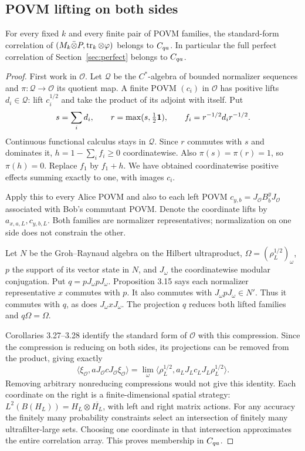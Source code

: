 \subsection{POVM lifting on both sides}
\begin{theorem}\label{thm:C}
For every fixed $k$ and every finite pair of POVM families, the standard-form correlation of $(M_k\bar\otimes P,\operatorname{tr}_k\otimes\varphi)$ belongs to $C_{qa}$. In particular the full perfect correlation of Section~\ref{sec:perfect} belongs to $C_{qa}$.
\end{theorem}
\begin{proof}
First work in $\mathcal O$. Let $\mathcal Q$ be the $C^*$-algebra of bounded normalizer sequences and $\pi:\mathcal Q\to\mathcal O$ its quotient map. A finite POVM $(c_i)$ in $\mathcal O$ has positive lifts $d_i\in\mathcal Q$: lift $c_i^{1/2}$ and take the product of its adjoint with itself. Put
\[
 s=\sum_i d_i,\qquad r=\max(s,\tfrac12\mathbf1),\qquad
 f_i=r^{-1/2}d_ir^{-1/2}.
\]
Continuous functional calculus stays in $\mathcal Q$. Since $r$ commutes with $s$ and dominates it, $h=1-\sum_i f_i\ge0$ coordinatewise. Also $\pi(s)=\pi(r)=1$, so $\pi(h)=0$. Replace $f_1$ by $f_1+h$. We have obtained coordinatewise positive effects summing exactly to one, with images $c_i$.

Apply this to every Alice POVM and also to each left POVM $c_{y,b}=J_{\mathcal O}B_b^yJ_{\mathcal O}$ associated with Bob's commutant POVM. Denote the coordinate lifts by $a_{x,a,L},c_{y,b,L}$. Both families are normalizer representatives; normalization on one side does not constrain the other.

Let $N$ be the Groh--Raynaud algebra on the Hilbert ultraproduct, $\Omega=(\rho_L^{1/2})_\omega$, $p$ the support of its vector state in $N$, and $J_\omega$ the coordinatewise modular conjugation. Put $q=pJ_\omega pJ_\omega$. Proposition 3.15 says each normalizer representative $x$ commutes with $p$. It also commutes with $J_\omega pJ_\omega\in N'$. Thus it commutes with $q$, as does $J_\omega xJ_\omega$. The projection $q$ reduces both lifted families and $q\Omega=\Omega$.

Corollaries 3.27--3.28 identify the standard form of $\mathcal O$ with this compression. Since the compression is reducing on both sides, its projections can be removed from the product, giving exactly
\begin{equation}\label{eq:ultralimit}
 \langle\xi_{\mathcal O},aJ_{\mathcal O}cJ_{\mathcal O}\xi_{\mathcal O}\rangle
 =\lim_\omega\langle\rho_L^{1/2},a_LJ_Lc_LJ_L\rho_L^{1/2}\rangle.
\end{equation}
Removing arbitrary nonreducing compressions would not give this identity. Each coordinate on the right is a finite-dimensional spatial strategy: $L^2(B(H_L))=H_L\otimes\overline{H_L}$, with left and right matrix actions. For any accuracy the finitely many probability constraints select an intersection of finitely many ultrafilter-large sets. Choosing one coordinate in that intersection approximates the entire correlation array. This proves membership in $C_{qa}$.


\end{proof}
